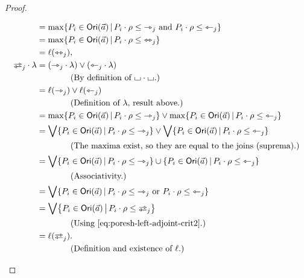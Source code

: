 \documentclass[a4paper]{memoir}
\begin{document}
\begin{proof}
\begin{enumerate}
\begin{itemize}
\begin{align*}
				&= \max \set{P_i \in \orisymbol(\vec a)}{P_i \cdot \rho \leq \jetsym_j \text{ and } P_i \cdot \rho \leq \tejsym_j} \\
				&= \max \set{P_i \in \orisymbol(\vec a)}{P_i \cdot \rho \leq \equijetsym_j} \\
				&= \ell(\equijetsym_j), \\
				\infrajetsym_j \cdot \lambda
				&= (\jetsym_j \cdot \lambda) \vee (\tejsym_j \cdot \lambda) \\
				& \qquad \qquad \text{(By definition of $\loch \cdot \loch$.)} \\
				&= \ell(\jetsym_j) \vee \ell(\tejsym_j) \\
				& \qquad \qquad \text{(Definition of $\lambda$, result above.)} \\
				&= \max \set{P_i \in \orisymbol(\vec a)}{P_i \cdot \rho \leq \jetsym_j} \vee \max \set{P_i \in \orisymbol(\vec a)}{P_i \cdot \rho \leq \tejsym_j} \\
				&= \bigvee \set{P_i \in \orisymbol(\vec a)}{P_i \cdot \rho \leq \jetsym_j} \vee \bigvee \set{P_i \in \orisymbol(\vec a)}{P_i \cdot \rho \leq \tejsym_j} \\
				& \qquad \qquad \text{(The maxima exist, so they are equal to the joins (suprema).)} \\
				&= \bigvee \set{P_i \in \orisymbol(\vec a)}{P_i \cdot \rho \leq \jetsym_j} \cup \set{P_i \in \orisymbol(\vec a)}{P_i \cdot \rho \leq \tejsym_j} \\
				& \qquad \qquad \text{(Associativity.)} \\
				&= \bigvee \set{P_i \in \orisymbol(\vec a)}{P_i \cdot \rho \leq \jetsym_j \text{ or } P_i \cdot \rho \leq \tejsym_j} \\
				&= \bigvee \set{P_i \in \orisymbol(\vec a)}{P_i \cdot \rho \leq \infrajetsym_j} \\
				& \qquad \qquad \text{(Using \cref{eq:poresh-left-adjoint-crit2}.)} \\
				&= \ell(\infrajetsym_j). \\
				& \qquad \qquad \text{(Definition and existence of $\ell$.)}
			\end{align*}

\end{itemize}
\end{enumerate}
\end{proof}
\end{document}
